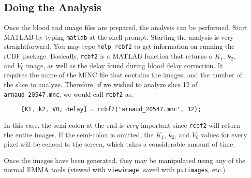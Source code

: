 \documentclass[12pt]{article}
\def\code#1{{\tt #1}}
\begin{document}
\subsection{Doing the Analysis}

Once the blood and image files are prepared, the analysis can be
performed.  Start MATLAB by typing \code{matlab} at the shell prompt.
Starting the analysis is very straightforward.  You may type
\code{help rcbf2} to get information on running the rCBF package.
Basically, \code{rcbf2} is a MATLAB function that returns a $K_1$,
$k_2$, and $V_0$ image, as well as the delay found during blood delay
correction.  It requires the name of the MINC file that contains the
images, and the number of the slice to analyze.  Therefore, if we
wished to analyze slice 12 of \code{arnaud\_20547.mnc}, we would call
\code{rcbf2} as:
%
\begin{verbatim}
     [K1, k2, V0, delay] = rcbf2('arnaud_20547.mnc', 12);
\end{verbatim}
%
In this case, the semi-colon at the end is {\em very} important since
\code{rcbf2} will return the entire images.  If the semi-colon is
omitted, the $K_1$, $k_2$, and $V_0$ values for every pixel will be
echoed to the screen, which takes a considerable amount of time.

Once the images have been generated, they may be manipulated using
any of the normal EMMA tools (viewed with \code{viewimage}, saved
with \code{putimages}, etc.).


\end{document}
